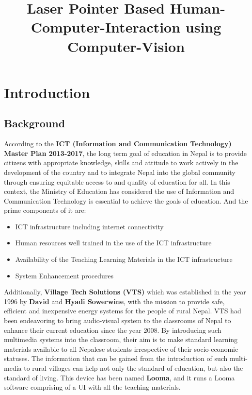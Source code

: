 \documentclass[12pt, a4paper]{article}
\title{\textbf{Laser Pointer Based Human-Computer-Interaction using Computer-Vision}}
\begin{document}
	\listoffigures
	\newpage
	\tableofcontents 
	\newpage

\section{Introduction}
\subsection{Background}
According to the \textbf{ICT (Information and Communication Technology) Master Plan 2013-2017}, the long term goal of education in Nepal is to provide citizens with appropriate knowledge, skills and attitude to work actively in the development of the country and to integrate Nepal into the global community through ensuring equitable access to and quality of education for all. In this context, the Ministry of Education has considered the use of Information and Communication Technology is essential to achieve the goals of education. And the prime components of it are:
\begin{itemize}

\item ICT infrastructure including internet connectivity
\item Human resources well trained in the use of the ICT infrastructure
\item Availability of the Teaching Learning Materials in the ICT infrastructure
\item System Enhancement procedures

\end{itemize}

Additionally, \textbf{Village Tech Solutions (VTS)} which was established in the year 1996 by \textbf{David} and \textbf{Hyadi Sowerwine}, with the mission to provide safe, efficient and inexpensive energy systems for the people of rural Nepal. VTS had been endeavoring to bring audio-visual system to the classrooms of Nepal to enhance their current education since the year 2008. By introducing such multimedia systems into the classroom, their aim is to make standard learning materials available to all Nepalese students irrespective of their socio-economic statuses. The information that can be gained from the introduction of such multi-media to rural villages can help not only the standard of education, but also the standard of living. This device has been named \textbf{Looma}, and it runs a Looma software comprising of a UI with all the teaching materials.  
\end{document}
